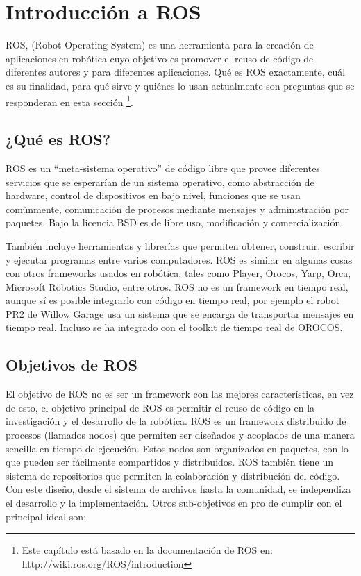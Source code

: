 \chapter{Introducción a ROS\protect}


ROS, (Robot Operating System) es una herramienta para la creación de aplicaciones en robótica cuyo objetivo es promover el reuso de código de diferentes autores y para diferentes aplicaciones. Qué es ROS exactamente, cuál es su finalidad, para qué sirve y quiénes lo usan actualmente son preguntas que se responderan en esta sección \footnote{Este capítulo está basado en la documentación de ROS en: http://wiki.ros.org/ROS/introduction}.

\section{¿Qué es ROS?}

ROS es un “meta-sistema operativo” de código libre que provee diferentes servicios que se esperarían de un sistema operativo, como abstracción de hardware, control de dispositivos en bajo nivel, funciones que se usan comúnmente, comunicación de procesos mediante mensajes y administración por paquetes. Bajo la licencia BSD es de libre uso, modificación y comercialización.

También incluye herramientas y librerías que permiten obtener, construir, escribir y ejecutar programas entre varios computadores. ROS es similar en algunas cosas con otros frameworks usados en robótica, tales como Player, Orocos, Yarp, Orca, Microsoft Robotics Studio, entre otros. ROS no es un framework en tiempo real, aunque sí es posible integrarlo con código en tiempo real, por ejemplo el robot PR2 de Willow Garage usa un sistema que se encarga de transportar mensajes en tiempo real. Incluso se ha integrado con el toolkit de tiempo real de OROCOS.


\section{Objetivos de ROS}

El objetivo de ROS no es ser un framework con las mejores características, en vez de esto, el objetivo principal de ROS es permitir el reuso de código en la investigación y el desarrollo de la robótica. ROS es un framework distribuido de procesos (llamados nodos) que permiten ser diseñados y acoplados de una manera sencilla en tiempo de ejecución. Estos nodos son organizados en paquetes, con lo que pueden ser fácilmente compartidos y distribuidos. ROS también tiene un sistema de repositorios que permiten la colaboración y distribución del código. Con este diseño, desde el sistema de archivos hasta la comunidad, se independiza el desarrollo y la implementación. Otros sub-objetivos en pro de cumplir con el  principal ideal son:

